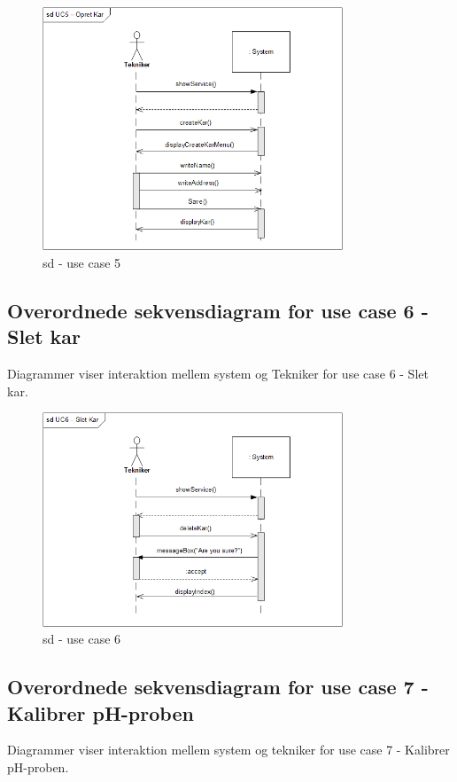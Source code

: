 \begin{figure}[H]
    \centering
    \includegraphics[width=0.8\textwidth]{Systemarkitektur/OverordnedeSekvensdiagrammer/sd_UC5.PNG}
    \caption{sd - use case 5}
    \label{fig:sd_UC5}
\end{figure}

\subsection{Overordnede sekvensdiagram for use case 6 - Slet kar}
Diagrammer viser interaktion mellem system og Tekniker for use case 6 - Slet kar.

\begin{figure}[H]
    \centering
    \includegraphics[width=0.8\textwidth]{Systemarkitektur/OverordnedeSekvensdiagrammer/sd_UC6.PNG}
    \caption{sd - use case 6}
    \label{fig:sd_UC6}
\end{figure}

\subsection{Overordnede sekvensdiagram for use case 7 - Kalibrer pH-proben}
Diagrammer viser interaktion mellem system og tekniker for use case 7 - Kalibrer pH-proben.

